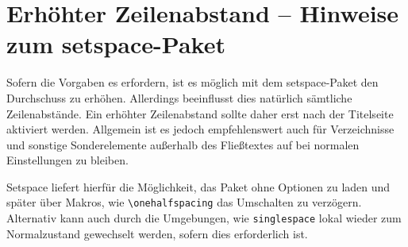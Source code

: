 \documentclass[
	ngerman,%
	accentcolor=9c,%
	ruledheaders=chapter,%
	class=book,%
	thesis={%
		type=dr,
		dr=rernat
	},
	fontsize=11pt,%
	parskip=half-,%
	custommargins=true,%
	marginpar=false,%
]{tudapub}
\newcommand*{\code}[1]{\texttt{#1}}
\let\tbs\textbackslash
\begin{document}
\section{Erhöhter Zeilenabstand -- Hinweise zum setspace-Paket}
Sofern die Vorgaben es erfordern, ist es möglich mit dem setspace-Paket den Durchschuss zu erhöhen. Allerdings beeinflusst dies natürlich sämtliche Zeilenabstände. Ein erhöhter Zeilenabstand sollte daher erst nach der Titelseite aktiviert werden. Allgemein ist es jedoch empfehlenswert auch für Verzeichnisse und sonstige Sonderelemente außerhalb des Fließtextes auf bei normalen Einstellungen zu bleiben.

Setspace liefert hierfür die Möglichkeit, das Paket ohne Optionen zu laden und später über Makros, wie \code{\tbs{}onehalfspacing} das Umschalten zu verzögern. Alternativ kann auch durch die Umgebungen, wie \code{singlespace} lokal wieder zum Normalzustand gewechselt werden, sofern dies erforderlich ist.

\printbibliography
\end{document}
